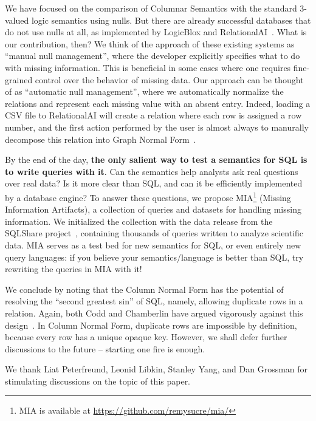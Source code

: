 \documentclass[sigconf,nonacm]{acmart}
\begin{document}
We have focused on the comparison of Columnar Semantics 
 with the standard 3-valued logic semantics using nulls.
But there are already successful databases
 that do not use nulls at all,
 as implemented by LogicBlox and RelationalAI~\cite{RAIDocumentation,DBLP:conf/sigmod/ArefCGKOPVW15}.
What is our contribution, then?
We think of the approach of these existing systems
 as ``manual null management'', 
 where the developer explicitly specifies what to do with missing information.
This is beneficial in some cases where one requires
 fine-grained control over the behavior of missing data.
Our approach can be thought of as ``automatic null management'',
 where we automatically normalize the relations 
 and represent each missing value with an absent entry.
Indeed, loading a \textsf{CSV} file to RelationalAI 
 will create a relation where each row is assigned a row number, 
 and the first action performed by the user is almost always 
 to manurally decompose this relation into Graph Normal Form~\cite{RAIDocumentation}.

By the end of the day, \textbf{the only salient way to test a semantics for SQL
 is to write queries with it}.
Can the semantics help analysts ask real questions 
 over real data?
Is it more clear than SQL, 
 and can it be efficiently implemented by a database engine?
To answer these questions, 
 we propose MIA\footnote{MIA is available at \url{https://github.com/remysucre/mia/}} (Missing Information Artifacts),
 a collection of queries and datasets 
 for handling missing information.
We initialized the collection with the data release 
 from the SQLShare project~\cite{DBLP:conf/sigmod/JainMHHL16},
 containing thousands of queries written to analyze scientific data.
MIA serves as a test bed for new semantics for SQL, 
 or even entirely new query languages:
 if you believe your semantics/language is better than SQL,
 try rewriting the queries in MIA with it!

We conclude by noting that
 the Column Normal Form has the potential of 
 resolving the ``second greatest sin'' of SQL, 
 namely, allowing duplicate rows in a relation.
Again, both Codd and Chamberlin have argued 
 vigorously against this design~\cite{DBLP:books/aw/Codd90,DBLP:conf/sigmod/Chamberlin23}.
In Column Normal Form, 
 duplicate rows are impossible by definition,
 because every row has a unique opaque key.
However, we shall defer further discussions 
 to the future -- starting one fire is enough.

\begin{acks}
We thank Liat Peterfreund, Leonid Libkin, 
 Stanley Yang, and Dan Grossman for stimulating 
 discussions on the topic of this paper.
\end{acks}



\end{document}
